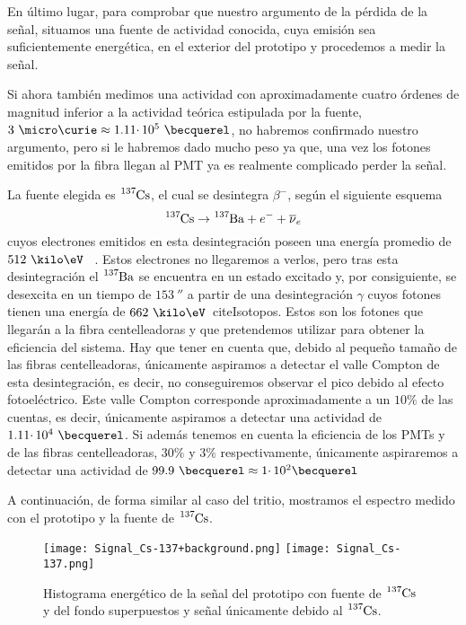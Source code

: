 En último lugar, para comprobar que nuestro argumento de la pérdida de la señal, situamos una fuente de actividad conocida, cuya emisión sea suficientemente energética, en el exterior del prototipo y procedemos a medir la señal. 

Si ahora también medimos una actividad con aproximadamente cuatro órdenes de magnitud inferior a la actividad teórica estipulada por la fuente, $3~\micro\curie \approx 1.11 \cdotp 10^{5}~\becquerel$, no habremos confirmado nuestro argumento, pero si le habremos dado mucho peso ya que, una vez los fotones emitidos por la fibra llegan al PMT ya es realmente complicado perder la señal. 

La fuente elegida es $\ce{^{137}Cs}$, el cual se desintegra $\beta^{-}$, según el siguiente esquema
\begin{equation}
\ce{^{137}Cs} \rightarrow \ce{^{137}Ba} + e^- + \overline{\nu}_e
\label{desintegracionbeta}
\end{equation}
cuyos electrones emitidos en esta desintegración poseen una energía promedio de $512~\kilo\eV$ ~\cite{Isotopos}. Estos electrones no llegaremos a verlos, pero tras esta desintegración el $\ce{^{137}Ba}$ se encuentra en un estado excitado y, por consiguiente, se desexcita en un tiempo de $153~\second$  a partir de una desintegración $\gamma$ cuyos fotones tienen una energía de $662~\kilo\eV$~cite{Isotopos}. Estos son los fotones que llegarán a la fibra centelleadoras y que pretendemos utilizar para obtener la eficiencia del sistema. Hay que tener en cuenta que, debido al pequeño tamaño de las fibras centelleadoras, únicamente aspiramos a detectar el valle Compton de esta desintegración, es decir, no conseguiremos observar el pico debido al efecto fotoeléctrico. Este valle Compton corresponde aproximadamente a un $10\%$ de las cuentas, es decir, únicamente aspiramos a detectar una actividad de $1.11 \cdotp 10^{4}~\becquerel$. Si además tenemos en cuenta la eficiencia de los PMTs y de las fibras centelleadoras, $30\%$ y $3\%$ respectivamente, únicamente aspiraremos a detectar una actividad de $99.9~\becquerel \approx 1 \cdotp 10^{2} \becquerel$

A continuación, de forma similar al caso del tritio, mostramos el espectro medido con el prototipo y la fuente de $\ce{^{137}Cs}$.

\begin{figure}[htb]
\centering
{
\texttt{[image: Signal\_Cs-137+background.png]} 
}
{
\texttt{[image: Signal\_Cs-137.png]} 
}
\caption{Histograma energético de la señal del prototipo con fuente de $\ce{^{137}Cs}$ y del fondo superpuestos y señal únicamente debido al $\ce{^{137}Cs}$.\label{senalcesio}}
\end{figure}

